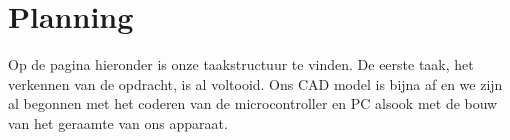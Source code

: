 \documentclass[kulak]{kulakarticle} %
\begin{document}
\section{Planning}
Op de pagina hieronder is onze taakstructuur te vinden. De eerste taak, het verkennen van de opdracht, is al voltooid. Ons CAD model is bijna af en we zijn al begonnen met het coderen van de microcontroller en PC alsook met de bouw van het geraamte van ons apparaat. 

\end{document}
